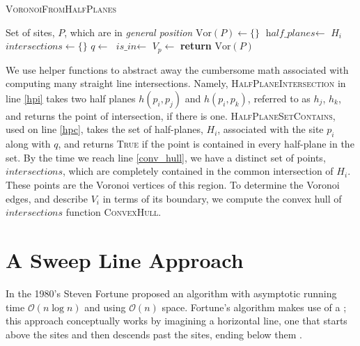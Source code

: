 \documentclass[12pt,twoside]{reedthesis}
\begin{document}
      \begin{algorithm}[H]
      \caption{\textsc{VoronoiFromHalfPlanes}}\label{v_half_plane}
      \begin{algorithmic}[1]
      \Require Set of sites, $P$, which are in \emph{general position}
      \State $\mbox{Vor}(P)\gets \{\} $
        \State $\textit{half\_planes}\gets$ $H_{i}$  
        \State $\textit{intersections}\gets \{\} $ 
          \State $q \gets$  \label{hpi}
          \State $\textit{is\_in}\gets$\label{hpc}
            \State {}
          \EndIf
        \EndFor
        \State $V_{p}\gets$\label{conv_hull}
        \State {}
      \EndFor
      \State \textbf{return} $\mbox{Vor}(P)$
      \EndProcedure
      \end{algorithmic} 
      \end{algorithm}

    We use helper functions to abstract away the cumbersome math associated with computing many straight line intersections. Namely, \textsc{HalfPlaneIntersection} in line \ref{hpi} takes two half planes $h(p_{i}, p_{j})$ and $h(p_{i}, p_{k})$, referred to as $h_{j}$, $h_{k}$, and returns the point of intersection, if there is one. \textsc{HalfPlaneSetContains}, used on line \ref{hpc}, takes the set of half-planes, $H_{i}$, associated with the site $p_{i}$ along with $q$, and returns \textsc{True} if the point is contained in every half-plane in the set. By the time we reach line \ref{conv_hull}, we have a distinct set of points, $intersections$, which are completely contained in the common intersection of $H_{i}$. These points are the Voronoi vertices of this region. To determine the Voronoi edges, and describe $V_{i}$ in terms of its boundary, we compute the convex hull of $intersections$ function \textsc{ConvexHull}. 

  

  \section{A Sweep Line Approach} %
  \label{sec:fortune_s_algorithm}
    In the 1980's Steven Fortune proposed an algorithm with asymptotic running time $\mathcal{O}(n\log n)$ and using $\mathcal{O}(n)$ space. Fortune's algorithm makes use of a ; this approach conceptually works by imagining a horizontal line, one that starts above the sites and then descends past the sites, ending below them \cite{fortune}.
\end{document}
